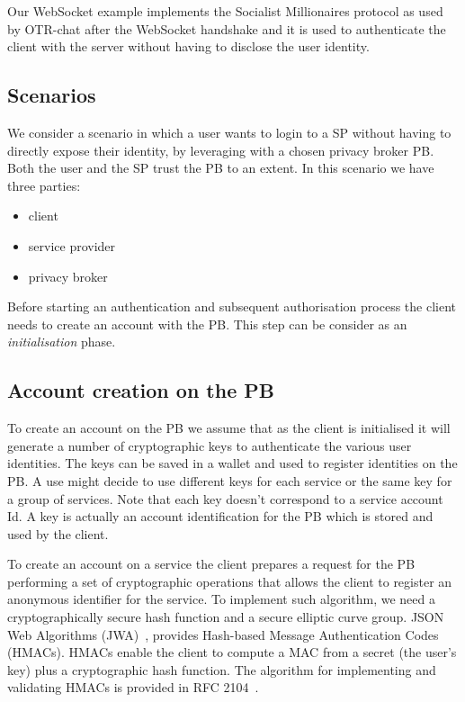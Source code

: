 Our WebSocket example implements the Socialist Millionaires protocol as used by OTR-chat after the WebSocket handshake and it is used to authenticate the client with the server without having to disclose the user identity.

\subsection{Scenarios}

We consider a scenario in which a user wants to login to a SP without having to directly expose their identity, by leveraging with a chosen privacy broker PB. Both the user and the SP trust the PB to an extent. In this scenario we have three parties:
\begin{itemize}
    \item client
    \item service provider
    \item privacy broker
\end{itemize}

Before starting an authentication and subsequent authorisation process the client needs to create an account with the PB. This step can be consider as an \emph{initialisation} phase.

\subsection{Account creation on the PB}

To create an account on the PB we assume that as the client is initialised it will generate a number of cryptographic keys to authenticate the various user identities. The keys can be saved in a wallet and used to register identities on the PB. A use might decide to use different keys for each service or the same key for a group of services. Note that each key doesn't correspond to a service account Id. A key is actually an account identification for the PB which is stored and used by the client.

To create an account on a service the client prepares a request for the PB performing a set of cryptographic operations that allows the client to register an anonymous identifier for the service. To implement such algorithm, we need a
cryptographically secure hash function and a secure elliptic curve group. JSON Web Algorithms (JWA)~\cite{jones2015jwa}, provides Hash-based Message Authentication Codes (HMACs). HMACs enable the client to compute a MAC from a secret (the user's key) plus a cryptographic hash function. The algorithm for implementing and validating HMACs is provided in RFC 2104~\cite{krawczyk1997rfc}.

